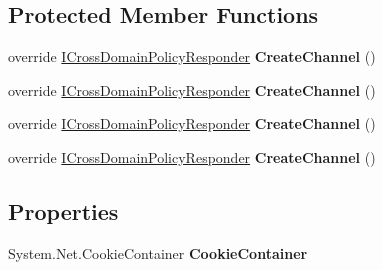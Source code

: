 \subsection*{Protected Member Functions}
\begin{DoxyCompactItemize}
\item 
\hypertarget{class_cross_domain_policy_responder_client_a0eac77a9d25918caa4f92a5a8e70cd68}{
override \hyperlink{interface_i_cross_domain_policy_responder}{ICrossDomainPolicyResponder} {\bfseries CreateChannel} ()}
\label{class_cross_domain_policy_responder_client_a0eac77a9d25918caa4f92a5a8e70cd68}

\item 
\hypertarget{class_cross_domain_policy_responder_client_a0eac77a9d25918caa4f92a5a8e70cd68}{
override \hyperlink{interface_i_cross_domain_policy_responder}{ICrossDomainPolicyResponder} {\bfseries CreateChannel} ()}
\label{class_cross_domain_policy_responder_client_a0eac77a9d25918caa4f92a5a8e70cd68}

\item 
\hypertarget{class_cross_domain_policy_responder_client_a0eac77a9d25918caa4f92a5a8e70cd68}{
override \hyperlink{interface_i_cross_domain_policy_responder}{ICrossDomainPolicyResponder} {\bfseries CreateChannel} ()}
\label{class_cross_domain_policy_responder_client_a0eac77a9d25918caa4f92a5a8e70cd68}

\item 
\hypertarget{class_cross_domain_policy_responder_client_a0eac77a9d25918caa4f92a5a8e70cd68}{
override \hyperlink{interface_i_cross_domain_policy_responder}{ICrossDomainPolicyResponder} {\bfseries CreateChannel} ()}
\label{class_cross_domain_policy_responder_client_a0eac77a9d25918caa4f92a5a8e70cd68}

\end{DoxyCompactItemize}
\subsection*{Properties}
\begin{DoxyCompactItemize}
\item 
\hypertarget{class_cross_domain_policy_responder_client_ac6051804d54134e8738376f13138706b}{
System.Net.CookieContainer {\bfseries CookieContainer}}
\label{class_cross_domain_policy_responder_client_ac6051804d54134e8738376f13138706b}

\end{DoxyCompactItemize}
